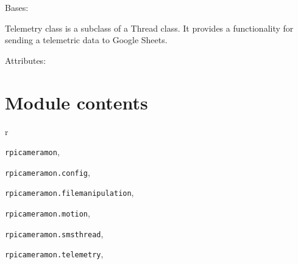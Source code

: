 \documentclass[letterpaper,10pt,english]{sphinxmanual}
\begin{document}

\begin{fulllineitems}
\label{rpicameramon:rpicameramon.telemetry.TelemetrySender}
Bases: 

Telemetry class is a subclass of a Thread class.
It provides a functionality for sending a telemetric data to
Google Sheets.

Attributes:

\begin{fulllineitems}
\label{rpicameramon:rpicameramon.telemetry.TelemetrySender.getTelemetry}
\end{fulllineitems}


\begin{fulllineitems}
\label{rpicameramon:rpicameramon.telemetry.TelemetrySender.run}
\end{fulllineitems}


\end{fulllineitems}



\chapter{Module contents}
\label{rpicameramon:module-contents}\label{rpicameramon:module-rpicameramon}

\renewcommand{\indexname}{Python Module Index}
\begin{theindex}
\def\bigletter#1{{\Large\sffamily#1}\nopagebreak\vspace{1mm}}
\bigletter{r}
\item {\texttt{rpicameramon}}, \pageref{rpicameramon:module-rpicameramon}
\item {\texttt{rpicameramon.config}}, \pageref{rpicameramon:module-rpicameramon.config}
\item {\texttt{rpicameramon.filemanipulation}}, \pageref{rpicameramon:module-rpicameramon.filemanipulation}
\item {\texttt{rpicameramon.motion}}, \pageref{rpicameramon:module-rpicameramon.motion}
\item {\texttt{rpicameramon.smsthread}}, \pageref{rpicameramon:module-rpicameramon.smsthread}
\item {\texttt{rpicameramon.telemetry}}, \pageref{rpicameramon:module-rpicameramon.telemetry}
\end{theindex}

\renewcommand{\indexname}{Index}
\printindex
\end{document}
